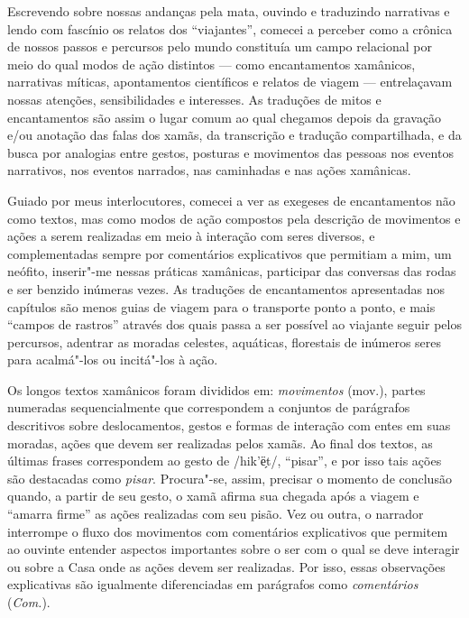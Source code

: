 Escrevendo sobre nossas andanças pela mata, ouvindo e traduzindo
narrativas e lendo com fascínio os relatos dos ``viajantes'', comecei a
perceber como a crônica de nossos passos e percursos pelo mundo
constituía um campo relacional por meio do qual modos de ação distintos
--- como encantamentos xamânicos, narrativas míticas, apontamentos
científicos e relatos de viagem --- entrelaçavam nossas atenções,
sensibilidades e interesses. As traduções de mitos e encantamentos são
assim o lugar comum ao qual chegamos depois da gravação e/ou anotação
das falas dos xamãs, da transcrição e tradução compartilhada, e da busca
por analogias entre gestos, posturas e movimentos das pessoas nos
eventos narrativos, nos eventos narrados, nas caminhadas e nas ações
xamânicas.

Guiado por meus interlocutores, comecei a ver as exegeses de
encantamentos não como textos, mas como modos de ação compostos pela
descrição de movimentos e ações a serem realizadas em meio à interação
com seres diversos, e complementadas sempre por comentários explicativos
que permitiam a mim, um neófito, inserir"-me nessas práticas xamânicas,
participar das conversas das rodas e ser benzido inúmeras vezes. As
traduções de encantamentos apresentadas nos capítulos são menos guias de
viagem para o transporte ponto a ponto, e mais ``campos de rastros''
através dos quais passa a ser possível ao viajante seguir pelos
percursos, adentrar as moradas celestes, aquáticas, florestais de
inúmeros seres para acalmá"-los ou incitá"-los à ação.

Os longos textos xamânicos foram divididos em: \textit{movimentos} (mov.),
partes numeradas sequencialmente que correspondem a conjuntos de
parágrafos descritivos sobre deslocamentos, gestos e formas de interação
com entes em suas moradas, ações que devem ser realizadas pelos xamãs.
Ao final dos textos, as últimas frases correspondem ao gesto de
/hik'ë̗t/, ``pisar'', e por isso tais ações são destacadas como
\textit{pisar}. Procura"-se, assim, precisar o momento de conclusão quando,
a partir de seu gesto, o xamã afirma sua chegada após a viagem e
``amarra firme'' as ações realizadas com seu pisão. Vez ou outra, o
narrador interrompe o fluxo dos movimentos com comentários explicativos
que permitem ao ouvinte entender aspectos importantes sobre o ser com o
qual se deve interagir ou sobre a Casa onde as ações devem ser
realizadas. Por isso, essas observações explicativas são igualmente
diferenciadas em parágrafos como \textit{comentários} (\textit{Com.}).

